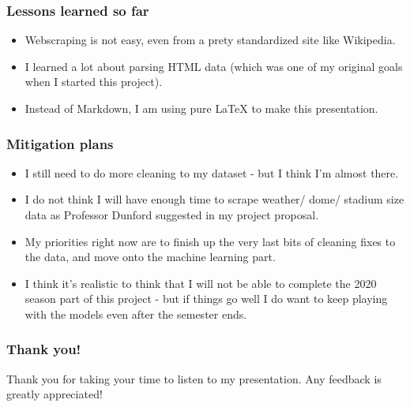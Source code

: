 \documentclass[t]{beamer}
\begin{document}
\begin{frame}
\frametitle{Lessons learned so far}

\begin{itemize}
\item<1->{Webscraping is not easy, even from a prety standardized site like Wikipedia.}
\item<2->{I learned a lot about parsing HTML data (which was one of my original goals when I started this project).}
	\item<3->{Instead of Markdown, I am using pure {\LaTeX}  to make this presentation.}

\end{itemize}
\end{frame}
\begin{frame}
\frametitle{Mitigation plans}
\begin{itemize}
\item<1->{I still need to do more cleaning to my dataset - but I think I'm almost there.}
\item<2->{I do not think I will have enough time to scrape weather/ dome/ stadium size data as Professor Dunford suggested in my project proposal.}
\item<3->{My priorities right now are to finish up the very last bits of cleaning fixes to the data, and move onto the machine learning part.}
\item<4->{I think it's realistic to think that I will not be able to complete the 2020 season part of this project - but if things go well I do want to keep playing with the models even after the semester ends.}



\end{itemize}
\end{frame}

\begin{frame}
\frametitle{Thank you!}%
Thank you for taking your time to listen to my presentation. Any feedback is greatly appreciated!
\end{frame}
\end{document}
